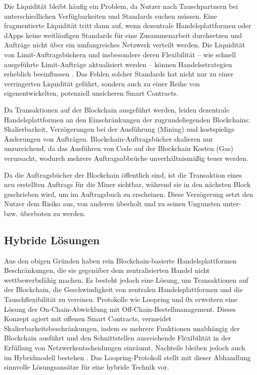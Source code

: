\documentclass[UTF8,nofonts]{article}
\begin{document}
\begin{multicols}{2}
Die Liquidität bleibt häufig ein Problem, da Nutzer nach Tauschpartnern bei unterschiedlichen Verfügbarkeiten und Standards suchen müssen. Eine fragmentierte Liquidität tritt dann auf, wenn dezentrale Handelsplattformen oder dApps keine weitläufigen Standards für eine Zusammenarbeit durchsetzen und Aufträge nicht über ein umfangreiches Netzwerk verteilt werden. Die Liquidität von Limit-Auftragsbüchern und insbesondere deren Flexibilität – wie schnell ausgeführte Limit-Aufträge aktualisiert werden – können Handelsstrategien erheblich beeinflussen \cite{limitorderliquidity}. Das Fehlen solcher Standards hat nicht nur zu einer verringerten Liquidität geführt, sondern auch zu einer Reihe von eigenentwickelten, potenziell unsicheren Smart Contracts.

Da Transaktionen auf der Blockchain ausgeführt werden, leiden dezentrale Handelsplattformen an den Einschränkungen der zugrundeliegenden Blockchains: Skalierbarkeit, Verzögerungen bei der Ausführung (Mining) und kostspielige Änderungen von Aufträgen. Blockchain-Auftragsbücher skalieren nur unzureichend, da das Ausführen von Code auf der Blockchain Kosten (Gas) verursacht, wodurch mehrere Auftragsabbrüche unverhältnismäßig teuer werden.

Da die Auftragsbücher der Blockchain öffentlich sind, ist die Transaktion eines neu erstellten Auftrags für die Miner sichtbar, während sie in den nächsten Block geschrieben wird, um im Auftragsbuch zu erscheinen. Diese Verzögerung setzt den Nutzer dem Risiko aus, von anderen überholt und zu seinen Ungunsten unter- bzw. überboten zu werden.

\subsection{Hybride Lösungen}
Aus den obigen Gründen haben rein Blockchain-basierte Handelsplattformen Beschränkungen, die sie gegenüber dem zentralisierten Handel nicht wettbewerbsfähig machen. Es besteht jedoch eine Lösung, um Transaktionen auf der Blockchain, die Geschwindigkeit von zentralen Handelsplattformen und die Tauschflexibilität zu vereinen. Protokolle wie Loopring und 0x \cite{warren20170x} erweitern eine Lösung der On-Chain-Abwicklung mit Off-Chain-Bestellmanagement. Dieses Konzept agiert mit offenen Smart Contracts, vermeidet Skalierbarkeitsbeschränkungen, indem es mehrere Funktionen unabhängig der Blockchain ausführt und den Schnittstellen ausreichende Flexibilität in der Erfüllung von Netzwerkentscheidungen einräumt. Nachteile bleiben jedoch auch im Hybridmodell bestehen \cite{costofdecent}. Das Loopring-Protokoll stellt mit dieser Abhandlung sinnvolle Lösungsansätze für eine hybride Technik vor.


\end{multicols}
\end{document}

